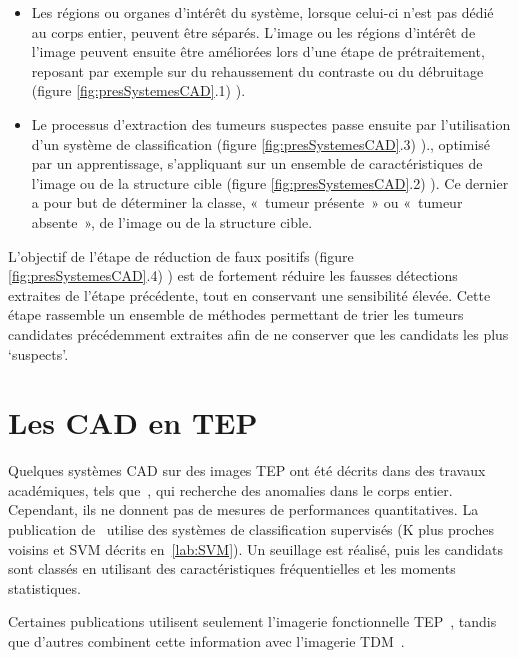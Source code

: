 \begin{itemize}
\item Les régions ou organes d’intérêt du système, lorsque celui-ci n’est pas dédié au corps entier, peuvent être séparés. L’image ou les régions d’intérêt de l’image peuvent ensuite être améliorées lors d’une étape de prétraitement, reposant par exemple sur du rehaussement du contraste ou du débruitage (figure \ref{fig:presSystemesCAD}.1) ).
\item Le processus d’extraction des tumeurs suspectes passe ensuite par l’utilisation d’un système de classification (figure \ref{fig:presSystemesCAD}.3) )., optimisé par un apprentissage, s’appliquant sur un ensemble de caractéristiques de l’image ou de la structure cible (figure \ref{fig:presSystemesCAD}.2) ). Ce dernier a pour but de déterminer la classe, « tumeur présente » ou « tumeur absente », de l’image ou de la structure cible. 
\end{itemize}
L’objectif de l’étape de réduction de faux positifs (figure \ref{fig:presSystemesCAD}.4) ) est de fortement réduire les fausses détections extraites de l’étape précédente, tout en conservant une sensibilité élevée. Cette étape rassemble un ensemble de méthodes permettant de trier les tumeurs candidates précédemment extraites afin de ne conserver que les candidats les plus ‘suspects’.  

	\section{Les CAD en TEP}
\label{lab:CADTEP}

Quelques systèmes CAD sur des images TEP ont été décrits dans des travaux académiques, tels que~\cite{guan2006automatic}, qui recherche des anomalies dans le corps entier. Cependant, ils ne donnent pas de mesures de performances quantitatives. La publication de~\cite{kanakatte2008pulmonary} utilise des systèmes de classification supervisés (K plus proches voisins et SVM décrits en~\ref{lab:SVM}). Un seuillage est réalisé, puis les candidats sont classés en utilisant des caractéristiques fréquentielles et les moments statistiques. 

Certaines publications utilisent seulement l'imagerie fonctionnelle TEP~\cite{ying2004novel, kanakatte2007pilot, kanakatte2008pulmonary, saradhi2009framework, el2009exploring, mhd2010artificial}, tandis que d'autres combinent cette information avec l'imagerie TDM~\cite{jafar2006computerized, nie2006integrating, potesil2007automated}.

